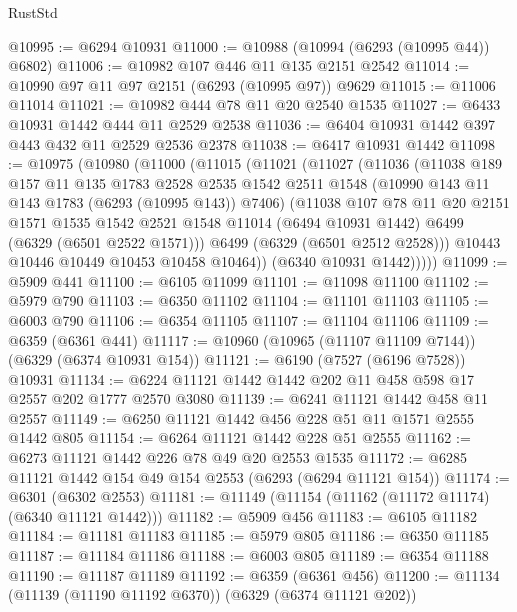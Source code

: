 \begin{lexlean}{RustStd}
\begin{coremodule}
{\begin{coremodule}
{{{{{{{{{{{{{{{{{{{{{{{{{{{{{{{{{{{@10995 := @6294 @10931
@11000 := @10988 (@10994 (@6293 (@10995 @44)) @6802)
@11006 := @10982 @107 @446 @11 @135 @2151 @2542
@11014 := @10990 @97 @11 @97 @2151 (@6293 (@10995 @97)) @9629
@11015 := @11006 @11014
@11021 := @10982 @444 @78 @11 @20 @2540 @1535
@11027 := @6433 @10931 @1442 @444 @11 @2529 @2538
@11036 := @6404 @10931 @1442 @397 @443 @432 @11 @2529 @2536 @2378
@11038 := @6417 @10931 @1442
@11098 := @10975
    (@10980
      (@11000
        (@11015
          (@11021
            (@11027
              (@11036
                (@11038
                  @189
                  @157
                  @11
                  @135
                  @1783
                  @2528
                  @2535
                  @1542
                  @2511
                  @1548
                  (@10990 @143 @11 @143 @1783 (@6293 (@10995 @143)) @7406)
                  (@11038
                    @107
                    @78
                    @11
                    @20
                    @2151
                    @1571
                    @1535
                    @1542
                    @2521
                    @1548
                    @11014
                    (@6494 @10931 @1442)
                    @6499
                    (@6329 (@6501 @2522 @1571)))
                  @6499
                  (@6329 (@6501 @2512 @2528)))
                @10443
                @10446
                @10449
                @10453
                @10458
                @10464))
            (@6340 @10931 @1442)))))
@11099 := @5909 @441
@11100 := @6105 @11099
@11101 := @11098 @11100
@11102 := @5979 @790
@11103 := @6350 @11102
@11104 := @11101 @11103
@11105 := @6003 @790
@11106 := @6354 @11105
@11107 := @11104 @11106
@11109 := @6359 (@6361 @441)
@11117 := @10960 (@10965 (@11107 @11109 @7144)) (@6329 (@6374 @10931 @154))
@11121 := @6190 (@7527 (@6196 @7528)) @10931
@11134 := @6224 @11121 @1442 @1442 @202 @11 @458 @598 @17 @2557 @202 @1777 @2570 @3080
@11139 := @6241 @11121 @1442 @458 @11 @2557
@11149 := @6250 @11121 @1442 @456 @228 @51 @11 @1571 @2555 @1442 @805
@11154 := @6264 @11121 @1442 @228 @51 @2555
@11162 := @6273 @11121 @1442 @226 @78 @49 @20 @2553 @1535
@11172 := @6285 @11121 @1442 @154 @49 @154 @2553 (@6293 (@6294 @11121 @154))
@11174 := @6301 (@6302 @2553)
@11181 := @11149 (@11154 (@11162 (@11172 @11174) (@6340 @11121 @1442)))
@11182 := @5909 @456
@11183 := @6105 @11182
@11184 := @11181 @11183
@11185 := @5979 @805
@11186 := @6350 @11185
@11187 := @11184 @11186
@11188 := @6003 @805
@11189 := @6354 @11188
@11190 := @11187 @11189
@11192 := @6359 (@6361 @456)
@11200 := @11134 (@11139 (@11190 @11192 @6370)) (@6329 (@6374 @11121 @202))
}}}}}}}}}}}}}}}}}}}}}}}}}}}}}}}}}}}
\end{coremodule}}
\end{coremodule}
\end{lexlean}
